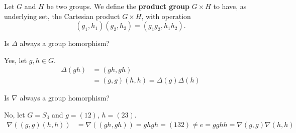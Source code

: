 \documentclass[12pt, letterpaper]{article}
\begin{document}
\begin{problem}{}
    Let $G$ and $H$ be two groups. We define the \textbf{product group} $G \times H$ to have, as underlying set, the Cartesian product $G \times H$, with operation
    \[(g_1,h_1)(g_2,h_2) = (g_1g_2,h_1h_2).\]
\end{problem}
\begin{subproblem}{}
    Is $\Delta$ always a group homorphism?
\end{subproblem}
\begin{problemproof}
    Yes, let $g,h \in G$.
    \begin{align*}
        \Delta(gh) &= (gh,gh)\\
                   &= (g,g)(h,h) = \Delta(g)\Delta(h)
    \end{align*}
\end{problemproof}
\begin{subproblem}{}
    Is $\nabla$ always a group homorphism?
\end{subproblem}
\begin{problemproof}
    No, let $G=S_3$ and $g=(12)$, $h=(23)$.
    \begin{align*}
        \nabla((g,g)(h,h)) &= \nabla((gh,gh)) = ghgh = (132) \neq
        e=gghh=\nabla(g,g)\nabla(h,h)
    \end{align*}
\end{problemproof}
\end{document}
